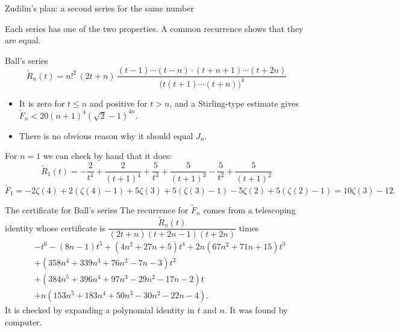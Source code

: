 \documentclass[aspectratio=169,11pt]{beamer}
\newcommand{\Dn}{D_n}
\begin{document}
\begin{frame}{Zudilin's plan: a second series for the same number}
  \centering
  \medskip

  Each series has one of the two properties. A common recurrence shows that they are equal.
\end{frame}

\begin{frame}{Ball's series}
  \[
    \widetilde R_n(t)=n!^2\,(2t+n)\,
    \frac{(t-1)\cdots(t-n)\cdot(t+n+1)\cdots(t+2n)}{\bigl(t(t+1)\cdots(t+n)\bigr)^4}
  \]
  \begin{itemize}
    \item It is zero for $t\le n$ and positive for $t>n$, and a Stirling-type estimate gives
      $\widetilde F_n<20(n+1)^4(\sqrt2-1)^{4n}$.
    \item There is no obvious reason why it should equal $J_n$.
  \end{itemize}
  For $n=1$ we can check by hand that it does:
  \[
    \widetilde R_1(t)=-\frac2{t^4}+\frac2{(t+1)^4}+\frac5{t^3}+\frac5{(t+1)^3}-\frac5{t^2}+\frac5{(t+1)^2}
  \]
  \[
    \widetilde F_1=-2\zeta(4)+2(\zeta(4)-1)+5\zeta(3)+5(\zeta(3)-1)-5\zeta(2)+5(\zeta(2)-1)=10\zeta(3)-12 .
  \]
\end{frame}

\begin{frame}{The certificate for Ball's series}
  The recurrence for $\widetilde F_n$ comes from a telescoping identity whose certificate is
  $\dfrac{\widetilde R_n(t)}{(2t+n)(t+2n-1)(t+2n)}$ times
  {\small
  \begin{align*}
    &-t^6-(8n-1)t^5+(4n^2+27n+5)t^4+2n(67n^2+71n+15)t^3\\
    &+(358n^4+339n^3+76n^2-7n-3)t^2\\
    &+(384n^5+396n^4+97n^3-29n^2-17n-2)t\\
    &+n(153n^5+183n^4+50n^3-30n^2-22n-4).
  \end{align*}}
  It is checked by expanding a polynomial identity in $t$ and $n$. It was found by computer.
\end{frame}
\end{document}
